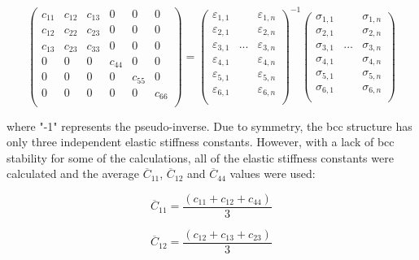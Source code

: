 \begin{equation}
\label{eq: hookes}
\begin{pmatrix}
	c_{11} & c_{12} & c_{13} & 0 & 0 & 0\\
	c_{12} & c_{22} & c_{23} & 0 & 0 & 0\\
	c_{13} & c_{23} & c_{33} & 0 & 0 & 0\\
	0 & 0 & 0 & c_{44} & 0 & 0\\
	0 & 0 & 0 & 0 &  c_{55} & 0\\
	0 & 0 & 0 & 0 & 0 & c_{66} \\    		
\end{pmatrix} =
\begin{pmatrix}
	\varepsilon_{1,1} & & \varepsilon_{1,n}\\
	\varepsilon_{2,1} & & \varepsilon_{2,n}\\
	\varepsilon_{3,1} & ... & \varepsilon_{3,n}\\
	\varepsilon_{4,1} & & \varepsilon_{4,n}\\
	\varepsilon_{5,1} & & \varepsilon_{5,n}\\
	\varepsilon_{6,1} & & \varepsilon_{6,n}\\					
\end{pmatrix}^{-1}
\begin{pmatrix}
	\sigma_{1,1} & & \sigma_{1,n}\\
	\sigma_{2,1} & & \sigma_{2,n}\\
	\sigma_{3,1} & ... & \sigma_{3,n}\\
	\sigma_{4,1} & & \sigma_{4,n}\\
	\sigma_{5,1} & & \sigma_{5,n}\\
	\sigma_{6,1} & & \sigma_{6,n}\\					
\end{pmatrix}
\end{equation}

\noindent where "-1" represents the pseudo-inverse. Due to symmetry, the bcc structure has only three independent elastic stiffness constants. However, with a lack of bcc stability for some of the calculations, all of the elastic stiffness constants were calculated and the average $\overline{C}_{11}$, $\overline{C}_{12}$ and $\overline{C}_{44}$ values were used:

\begin{equation}
\label{eq: averagec11}
\overline{C}_{11} = \frac{(c_{11} + c_{12} + c_{44})}{3}
\end{equation}

\begin{equation}
\label{eq: averagec12}
\overline{C}_{12} = \frac{(c_{12} + c_{13} + c_{23})}{3}
\end{equation}

